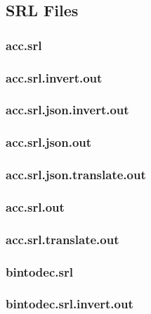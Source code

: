\subsection{SRL Files}
\label{app:test_srl_files}
\subsubsection{acc.srl}
\label{app:acc_srl}

\subsubsection{acc.srl.invert.out}
\label{app:acc_srl.invert.out}

\subsubsection{acc.srl.json.invert.out}
\label{app:acc_srl.json.invert.out}

\subsubsection{acc.srl.json.out}
\label{app:acc_srl.json.out}

\subsubsection{acc.srl.json.translate.out}
\label{app:acc_srl.json.translate.out}

\subsubsection{acc.srl.out}
\label{app:acc_srl.out}

\subsubsection{acc.srl.translate.out}
\label{app:acc_srl.translate.out}

\subsubsection{bintodec.srl}
\label{app:bintodec_srl}

\subsubsection{bintodec.srl.invert.out}
\label{app:bintodec_srl.invert.out}

